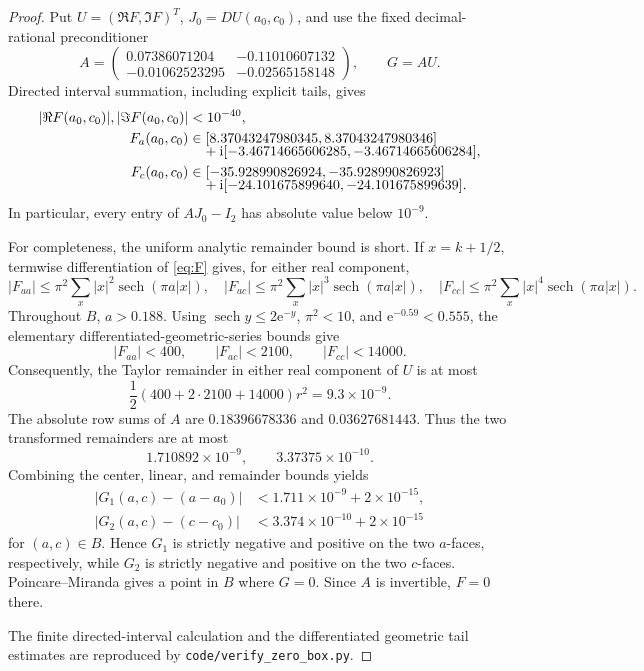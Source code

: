 \documentclass[11pt]{article}
\newcommand{\sech}{\operatorname{sech}}
\newcommand{\e}{\mathrm e}
\newcommand{\ii}{\mathrm i}
\begin{document}
\begin{proof}
Put \(U=(\Re F,\Im F)^T\), \(J_0=DU(a_0,c_0)\), and use the fixed
decimal-rational preconditioner
\[
 A=\begin{pmatrix}
 0.07386071204&-0.11010607132\\
 -0.01062523295&-0.02565158148
 \end{pmatrix},\qquad G=AU.
\]
Directed interval summation, including explicit tails, gives
\begin{align*}
 |\Re F(a_0,c_0)|, |\Im F(a_0,c_0)|&<10^{-40},\\
 F_a(a_0,c_0)&\in
 [8.37043247980345,8.37043247980346]\notag\\[-2mm]
 &\quad+\ii[-3.46714665606285,-3.46714665606284],\\
 F_c(a_0,c_0)&\in
 [-35.928990826924,-35.928990826923]\notag\\[-2mm]
 &\quad+\ii[-24.101675899640,-24.101675899639].
\end{align*}
In particular, every entry of \(AJ_0-I_2\) has absolute value below
\(10^{-9}\).

For completeness, the uniform analytic remainder bound is short.  If
\(x=k+1/2\), termwise differentiation of \eqref{eq:F} gives, for either real
component,
\[
 |F_{aa}|\le \pi^2\sum_x |x|^2\sech(\pi a|x|),\quad
 |F_{ac}|\le \pi^2\sum_x |x|^3\sech(\pi a|x|),\quad
 |F_{cc}|\le \pi^2\sum_x |x|^4\sech(\pi a|x|).
\]
Throughout \(B\), \(a>0.188\).  Using
\(\sech y\le2\e^{-y}\), \(\pi^2<10\), and
\(\e^{-0.59}<0.555\), the elementary differentiated-geometric-series
bounds give
\[
 |F_{aa}|<400,\qquad |F_{ac}|<2100,\qquad |F_{cc}|<14000.
\]
Consequently, the Taylor remainder in either real component of \(U\) is at
most
\[
 \frac12(400+2\cdot2100+14000)r^2=9.3\times10^{-9}.
\]
The absolute row sums of \(A\) are \(0.18396678336\) and
\(0.03627681443\).  Thus the two transformed remainders are at most
\[
 1.710892\times10^{-9},\qquad 3.37375\times10^{-10}.
\]
Combining the center, linear, and remainder bounds yields
\begin{align*}
 |G_1(a,c)-(a-a_0)|&<1.711\times10^{-9}+2\times10^{-15},\\
 |G_2(a,c)-(c-c_0)|&<3.374\times10^{-10}+2\times10^{-15}
\end{align*}
for \((a,c)\in B\).  Hence \(G_1\) is strictly negative and positive on
the two \(a\)-faces, respectively, while \(G_2\) is strictly negative and
positive on the two \(c\)-faces.  Poincare--Miranda gives a point in \(B\)
where \(G=0\).  Since \(A\) is invertible, \(F=0\) there.

The finite directed-interval calculation and the differentiated geometric
tail estimates are reproduced by \texttt{code/verify\_zero\_box.py}.
\end{proof}
\end{document}
